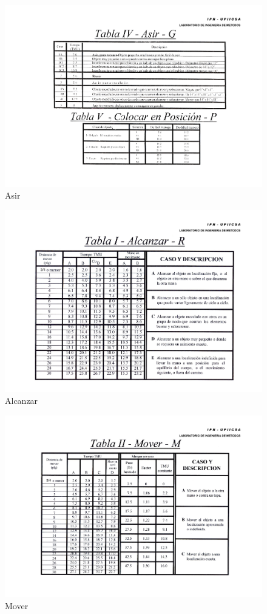     \begin{figure}[H]
        \centering
        \includegraphics[scale=0.4]{13/img/tablaAsir.pdf}
        \caption{Asir}
        \label{fig:Asir}
    \end{figure}
    \begin{figure}[H]
        \centering
        \includegraphics[scale=0.3]{13/img/tablaAlcanzar.pdf}
        \caption{Alcanzar}
        \label{fig:Alcanzar}
    \end{figure}
    \begin{figure}[H]
        \centering
        \includegraphics[scale=0.3]{13/img/tablaMover.pdf}
        \caption{Mover}
        \label{fig:Mover}
    \end{figure}
